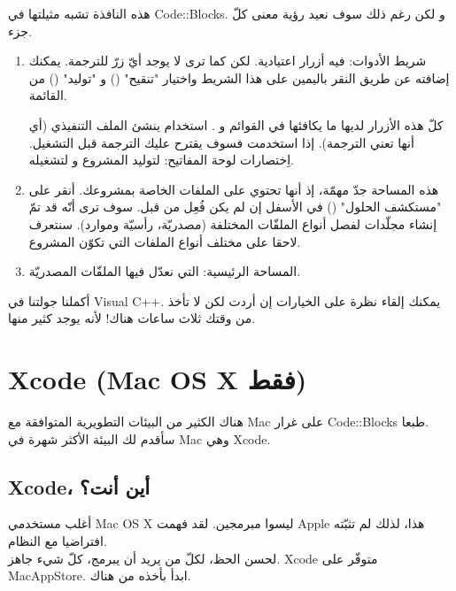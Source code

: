 هذه النافذة تشبه مثيلتها في
\textenglish{Code::Blocks}.
و لكن رغم ذلك سوف نعيد رؤية معنى كلّ جزء.

\begin{enumerate}
  \item شريط الأدوات: فيه أزرار اعتيادية. لكن كما ترى لا يوجد أيّ زرّ للترجمة. يمكنك إضافته عن طريق النقر باليمين على هذا الشريط واختيار
"تنقيح"
()
و
"توليد"
()
من القائمة.

كلّ هذه الأزرار لديها ما يكافئها في القوائم
و
.
استخدام
ينشئ الملف التنفيذي (أي أنها تعني الترجمة). إذا استخدمت
فسوف يقترح عليك الترجمة قبل التشغيل. اِختصارات لوحة المفاتيح:
لتوليد المشروع و
لتشغيله.
  \item هذه المساحة جدّ مهمّة، إذ أنها تحتوي على الملفات الخاصة بمشروعك. أنقر على
"مستكشف الحلول"
()
في الأسفل إن لم يكن فُعِل من قبل. سوف ترى أنّه قد تمّ إنشاء مجلّدات لفصل أنواع الملفّات المختلفة (مصدريّة، رأسيّة وموارد). سنتعرف لاحقا على مختلف أنواع الملفات التي تكوّن المشروع.
  \item المساحة الرئيسية: التي نعدّل فيها الملفّات المصدريّة.
\end{enumerate}

أكملنا جولتنا في
\textenglish{Visual C++}.
يمكنك إلقاء نظرة على
الخيارات
إن أردت لكن لا تأخذ من وقتك ثلاث ساعات هناك! لأنه يوجد كثير منها.

\section{\textenglish{Xcode} (\textenglish{Mac OS X} فقط)}

هناك الكثير من البيئات التطويرية المتوافقة مع
\textenglish{Mac}
على غرار
\textenglish{Code::Blocks}
طبعا.\\
سأقدم لك البيئة الأكثر شهرة في \textenglish{Mac} وهي
\textenglish{Xcode}.

\subsection{\textenglish{Xcode}،
 أين أنت؟}

أغلب مستخدمي
\textenglish{Mac OS X}
ليسوا مبرمجين. لقد فهمت
\textenglish{Apple}
هذا، لذلك لم تثبّته افتراضيا مع النظام.\\
لحسن الحظ، لكلّ من يريد أن يبرمج، كلّ شيء جاهز.
\textenglish{Xcode}
متوفّر على
\textenglish{MacAppStore}.
ابدأ بأخذه من هناك.

